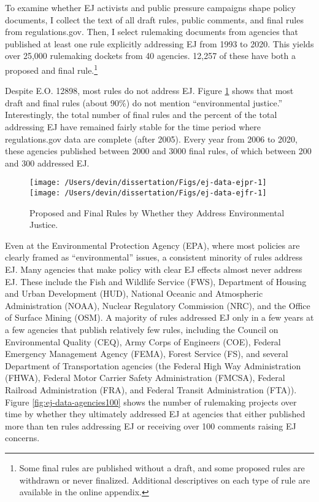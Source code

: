 \documentclass[
      12pt,
        ]{article}
\begin{document}
To examine whether EJ activists and public pressure campaigns shape policy documents,
I collect the text of all draft rules, public comments, and final rules from regulations.gov. Then, I select rulemaking documents from agencies that published at least one rule explicitly addressing EJ from 1993 to 2020. This yields over 25,000 rulemaking dockets from 40 agencies. 12,257 of these have both a proposed and final rule.\footnote{Some final rules are published without a draft, and some proposed rules are withdrawn or never finalized. Additional descriptives on each type of rule are available in the online appendix.}

Despite E.O. 12898, most rules do not address EJ. Figure \ref{fig:ej-data} shows that most draft and final rules (about 90\%) do not mention ``environmental justice.'' Interestingly, the total number of final rules and the percent of the total addressing EJ have remained fairly stable for the time period where regulations.gov data are complete (after 2005). Every year from 2006 to 2020, these agencies published between 2000 and 3000 final rules, of which between 200 and 300 addressed EJ.

\begin{figure}

{\centering \texttt{[image: /Users/devin/dissertation/Figs/ej-data-ejpr-1]} \texttt{[image: /Users/devin/dissertation/Figs/ej-data-ejfr-1]} 

}

\caption{Proposed and Final Rules by Whether they Address Environmental Justice.}\label{fig:ej-data}
\end{figure}

Even at the Environmental Protection Agency (EPA), where most policies are clearly framed as ``environmental'' issues, a consistent minority of rules address EJ. Many agencies that make policy with clear EJ effects almost never address EJ. These include the Fish and Wildlife Service (FWS), Department of Housing and Urban Development (HUD), National Oceanic and Atmospheric Administration (NOAA), Nuclear Regulatory Commission (NRC), and the Office of Surface Mining (OSM). A majority of rules addressed EJ only in a few years at a few agencies that publish relatively few rules, including the Council on Environmental Quality (CEQ), Army Corps of Engineers (COE), Federal Emergency Management Agency (FEMA), Forest Service (FS), and several Department of Transportation agencies (the Federal High Way Administration (FHWA), Federal Motor Carrier Safety Administration (FMCSA), Federal Railroad Administration (FRA), and Federal Transit Administration (FTA)). Figure \ref{fig:ej-data-agencies100} shows the number of rulemaking projects over time by whether they ultimately addressed EJ at agencies that either published more than ten rules addressing EJ or receiving over 100 comments raising EJ concerns.
\end{document}
